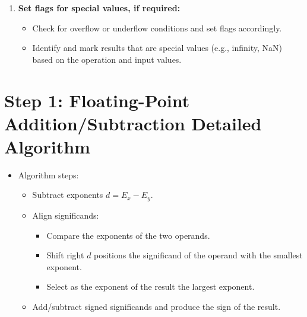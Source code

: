 \documentclass[12pt,openany]{book}
\begin{document}
\begin{itemize}
\begin{enumerate}
			      		      	\item \textbf{Set flags for special values, if required:}
			      		      	      \begin{itemize}
			      		      	      	\item Check for overflow or underflow conditions and set flags accordingly.
			      		      	      	\item Identify and mark results that are special values (e.g., infinity, NaN) based on the operation and input values.
			      		      	      \end{itemize}
			      		      \end{enumerate}
			      	\end{itemize}
			      	    
			      	\section*{Step 1: Floating-Point Addition/Subtraction Detailed Algorithm}
			      	\begin{itemize}
			      		\item[] Algorithm steps:
			      		      \begin{itemize}
			      		      	\item Subtract exponents \(d = E_x - E_y\).
			      		      	\item Align significands:
			      		      	      \begin{itemize}
			      		      	      	\item Compare the exponents of the two operands.
			      		      	      	\item Shift right \(d\) positions the significand of the operand with the smallest exponent.
			      		      	      	\item Select as the exponent of the result the largest exponent.
			      		      	      \end{itemize}
			      		      	\item Add/subtract signed significands and produce the sign of the result.
			      		      \end{itemize}
			      	\end{itemize}
			      	    
\end{document}

